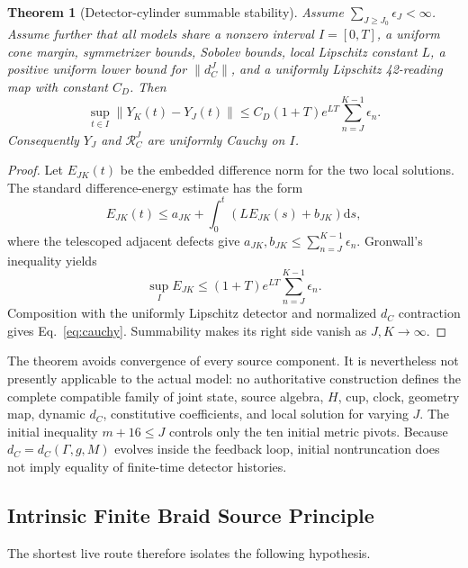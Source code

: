 \documentclass[11pt]{article}
\newtheorem{theorem}{Theorem}[section]
\theoremstyle{definition}
\theoremstyle{remark}
\newcommand{\dd}{\mathrm{d}}
\newcommand{\RC}{\mathcal{R}_{C}}
\begin{document}
\begin{theorem}[Detector-cylinder summable stability]\label{thm:cutoff}
Assume $\sum_{J\ge J_0}\epsilon_J<\infty$. Assume further that all models share a nonzero interval $I=[0,T]$, a uniform cone margin, symmetrizer bounds, Sobolev bounds, local Lipschitz constant $L$, a positive uniform lower bound for $\|d_C^J\|$, and a uniformly Lipschitz 42-reading map with constant $C_D$. Then
\begin{equation}\label{eq:cauchy}
 \sup_{t\in I}\|Y_K(t)-Y_J(t)\|
 \le C_D(1+T)e^{LT}\sum_{n=J}^{K-1}\epsilon_n.
\end{equation}
Consequently $Y_J$ and $\RC^J$ are uniformly Cauchy on $I$.
\end{theorem}

\begin{proof}
Let $E_{JK}(t)$ be the embedded difference norm for the two local solutions. The standard difference-energy estimate has the form
\begin{equation}
 E_{JK}(t)\le a_{JK}+\int_0^t\left(LE_{JK}(s)+b_{JK}\right)\dd s,
\end{equation}
where the telescoped adjacent defects give
$a_{JK},b_{JK}\le\sum_{n=J}^{K-1}\epsilon_n$.
Gronwall's inequality yields
\begin{equation}
 \sup_I E_{JK}\le(1+T)e^{LT}\sum_{n=J}^{K-1}\epsilon_n.
\end{equation}
Composition with the uniformly Lipschitz detector and normalized $d_C$ contraction gives Eq.~\eqref{eq:cauchy}. Summability makes its right side vanish as $J,K\to\infty$.
\end{proof}

The theorem avoids convergence of every source component. It is nevertheless not presently applicable to the actual model: no authoritative construction defines the complete compatible family of joint state, source algebra, $H$, cup, clock, geometry map, dynamic $d_C$, constitutive coefficients, and local solution for varying $J$. The initial inequality $m+16\le J$ controls only the ten initial metric pivots. Because $d_C=d_C(\Gamma,g,M)$ evolves inside the feedback loop, initial nontruncation does not imply equality of finite-time detector histories.

\subsection{Intrinsic Finite Braid Source Principle}

The shortest live route therefore isolates the following hypothesis.
\end{document}
